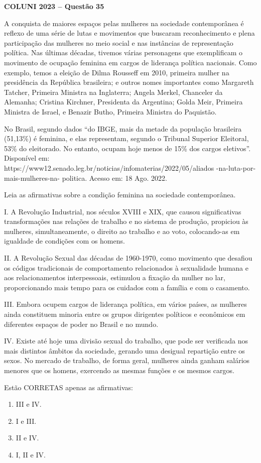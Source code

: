 \textbf{COLUNI 2023 -- Questão 35}\par\medskip A conquista de maiores espaços pelas mulheres na sociedade contemporânea é reflexo de uma série de lutas e movimentos que buscaram reconhecimento e plena participação das mulheres no meio social e nas instâncias de representação política. Nas últimas décadas, tivemos várias personagens que exemplificam o movimento de ocupação feminina em cargos de liderança política nacionais. Como exemplo, temos a eleição de Dilma Rousseff em 2010, primeira mulher na presidência da República brasileira; e outros nomes importantes como Margareth Tatcher, Primeira Ministra na Inglaterra; Angela Merkel, Chanceler da Alemanha; Cristina Kirchner, Presidenta da Argentina; Golda Meir, Primeira Ministra de Israel, e Benazir Butho, Primeira Ministra do Paquistão.

\par

No Brasil, segundo dados “do IBGE, mais da metade da população brasileira (51,13\%) é feminina, e elas representam, segundo o Tribunal Superior Eleitoral, 53\% do eleitorado. No entanto, ocupam hoje menos de 15\% dos cargos eletivos”. Disponível em: https://www12.senado.leg.br/noticias/infomaterias/2022/05/aliados -na-luta-por-mais-mulheres-na- politica. Acesso em: 18 Ago. 2022.

\par

Leia as afirmativas sobre a condição feminina na sociedade contemporânea.

\par

I.   A Revolução Industrial, nos séculos XVIII e XIX, que causou significativas transformações nas relações de trabalho e no sistema de produção, propiciou às mulheres, simultaneamente, o direito ao trabalho e ao voto, colocando-as em igualdade de condições com os homens.

II. A Revolução Sexual das décadas de 1960-1970, como movimento que desafiou os códigos tradicionais de comportamento relacionados à sexualidade humana e aos relacionamentos interpessoais, estimulou a fixação da mulher no lar, proporcionando mais tempo para os cuidados com a família e com o casamento.

III. Embora ocupem cargos de liderança política, em vários países, as mulheres ainda constituem minoria entre os grupos dirigentes políticos e econômicos em diferentes espaços de poder no Brasil e no mundo.

IV. Existe até hoje uma divisão sexual do trabalho, que pode ser verificada nos mais distintos âmbitos da sociedade, gerando uma desigual repartição entre os sexos. No mercado de trabalho, de forma geral, mulheres ainda ganham salários menores que os homens, exercendo as mesmas funções e os mesmos cargos.

\par

Estão CORRETAS apenas as afirmativas:\begin{enumerate}
\item III e IV.
\item I e III.
\item II e IV.
\item I, II e IV.\end{enumerate}
